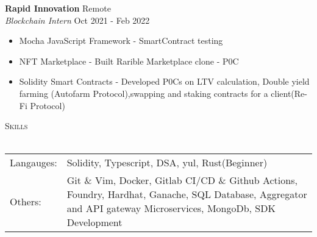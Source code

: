 \documentclass[a4paper]{article}
\newcommand{\lineunder} {
    \vspace*{-8pt} \\
    \hspace*{-18pt} \hrulefill \\
}
\newcommand{\header} [1] {
    {\hspace*{-18pt}\vspace*{6pt} \textsc{#1}}
    \vspace*{-6pt} \lineunder
}
\begin{document}
\textbf{Rapid Innovation} \hfill Remote\\
\textit{Blockchain Intern} \hfill Oct 2021 - Feb 2022\\
\vspace{-1mm}
\begin{itemize} \itemsep 1pt
	\item Mocha JavaScript Framework - SmartContract testing
	\item NFT Marketplace - Built Rarible Marketplace clone - P0C
    \item Solidity Smart Contracts - Developed P0Cs on LTV calculation, Double yield farming (Autofarm Protocol),swapping and staking contracts for a client(Re-Fi Protocol)
\end{itemize}

\header{Skills}
\begin{tabularx}{\textwidth}{ l X } 
	Langauges:  & Solidity, Typescript, DSA, yul, Rust(Beginner)\\
	Others:     & Git \& Vim, Docker, Gitlab CI/CD \& Github Actions, Foundry, Hardhat, Ganache, SQL Database, Aggregator and API gateway Microservices, MongoDb, SDK Development \\
\end{tabularx}
\vspace{2mm}
\end{document}
